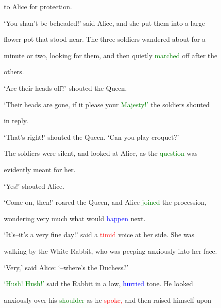  to Alice for protection.



 ‘You shan’t be beheaded!’ said Alice, and she put them into a large

 flower-pot that stood near. The three \textcolor{BurntOrange}{soldiers} wandered about for a

 minute or two, looking for them, and then quietly \textcolor{green}{marched} off after the

 others.



 ‘Are their heads off?’ \textcolor{BurntOrange}{shouted} the Queen.



 ‘Their heads are gone, if it please your \textcolor{green}{Majesty!’} the \textcolor{BurntOrange}{soldiers} \textcolor{BurntOrange}{shouted}

 in reply.



 ‘That’s right!’ \textcolor{BurntOrange}{shouted} the Queen. ‘Can you play croquet?’



 The \textcolor{BurntOrange}{soldiers} were silent, and looked at Alice, as the \textcolor{green}{question} was

 evidently meant for her.



 ‘Yes!’ \textcolor{BurntOrange}{shouted} Alice.



 ‘Come on, then!’ roared the Queen, and Alice \textcolor{green}{joined} the \textcolor{BurntOrange}{procession,}

 wondering very much what would \textcolor{blue}{happen} next.



 ‘It’s--it’s a very fine day!’ said a \textcolor{red}{timid} voice at her side. She was

 walking by the \textcolor{BurntOrange}{White} Rabbit, who was peeping anxiously into her face.



 ‘Very,’ said Alice: ‘--where’s the Duchess?’



 \textcolor{green}{‘Hush!} \textcolor{green}{Hush!’} said the Rabbit in a low, \textcolor{blue}{hurried} tone. He looked

 anxiously over his \textcolor{green}{shoulder} as he \textcolor{red}{spoke,} and then raised himself upon

